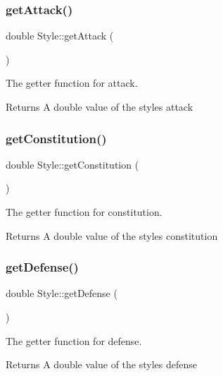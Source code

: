 \subsubsection{\texorpdfstring{getAttack()}{getAttack()}}
{\footnotesize\ttfamily double Style\+::get\+Attack (\begin{DoxyParamCaption}{ }\end{DoxyParamCaption})}



The getter function for attack. 

\begin{DoxyReturn}{Returns}
A double value of the style\textquotesingle{}s attack 
\end{DoxyReturn}
\mbox{\label{class_style_afffe5458fde2c128c83e20a47654586d}} 
\subsubsection{\texorpdfstring{getConstitution()}{getConstitution()}}
{\footnotesize\ttfamily double Style\+::get\+Constitution (\begin{DoxyParamCaption}{ }\end{DoxyParamCaption})}



The getter function for constitution. 

\begin{DoxyReturn}{Returns}
A double value of the style\textquotesingle{}s constitution 
\end{DoxyReturn}
\mbox{\label{class_style_a16f8ba98a066b96aa2900f1c9af6d716}} 
\subsubsection{\texorpdfstring{getDefense()}{getDefense()}}
{\footnotesize\ttfamily double Style\+::get\+Defense (\begin{DoxyParamCaption}{ }\end{DoxyParamCaption})}



The getter function for defense. 

\begin{DoxyReturn}{Returns}
A double value of the style\textquotesingle{}s defense 
\end{DoxyReturn}
\mbox{\label{class_style_a3639ba6dda8813519aa5069ea9510cfd}} 
